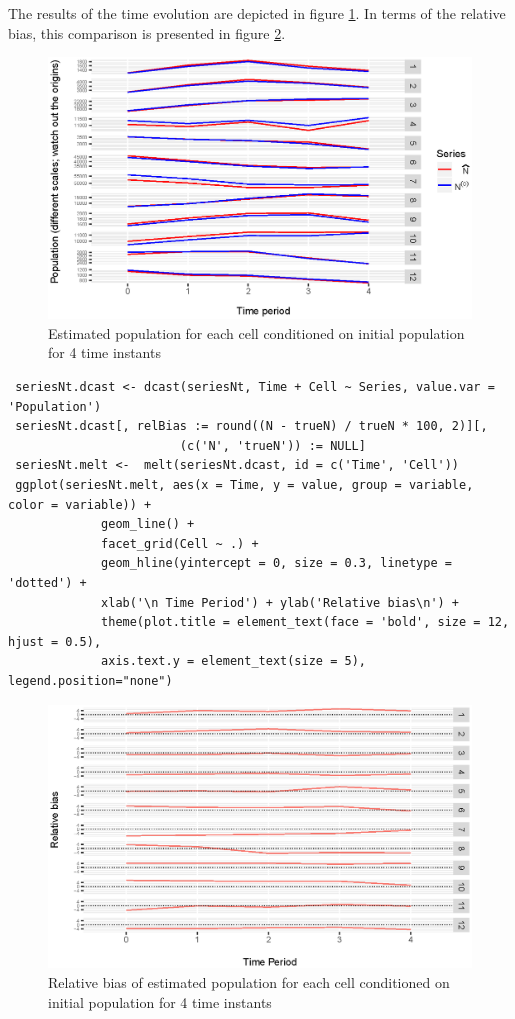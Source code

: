 \documentclass[12pt, a4paper]{article}
\begin{document}
The results of the time evolution are depicted in figure \ref{time3}. In terms of the relative bias, 
this comparison is presented in figure \ref{time4}.

\begin{figure}
	\centering
	\includegraphics[scale=0.85]{time3.eps}
	\caption{Estimated population for each cell conditioned on initial population for 4 time instants}
	\label{time3} 	
\end{figure}
 
 
 \begin{verbatim}
 seriesNt.dcast <- dcast(seriesNt, Time + Cell ~ Series, value.var = 'Population')
 seriesNt.dcast[, relBias := round((N - trueN) / trueN * 100, 2)][, 
                        (c('N', 'trueN')) := NULL]
 seriesNt.melt <-  melt(seriesNt.dcast, id = c('Time', 'Cell'))
 ggplot(seriesNt.melt, aes(x = Time, y = value, group = variable, color = variable)) + 
             geom_line() + 
             facet_grid(Cell ~ .) +
             geom_hline(yintercept = 0, size = 0.3, linetype = 'dotted') + 
             xlab('\n Time Period') + ylab('Relative bias\n') +
             theme(plot.title = element_text(face = 'bold', size = 12, hjust = 0.5), 
             axis.text.y = element_text(size = 5), legend.position="none")
 \end{verbatim}
 
\begin{figure}
	\centering
	\includegraphics[scale=0.85]{time4.eps}
	\caption{Relative bias of estimated population for each cell conditioned on initial population for 4 time instants}
	\label{time4} 	
\end{figure}
\end{document}
